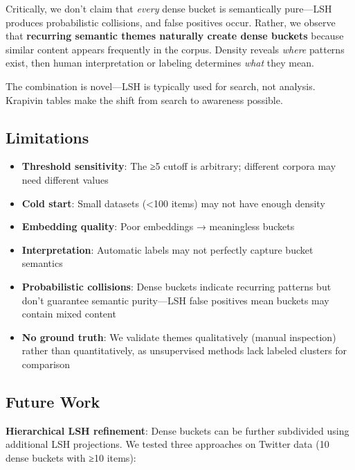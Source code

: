 \documentclass[
]{article}
\providecommand{\tightlist}{%
  \setlength{\itemsep}{0pt}\setlength{\parskip}{0pt}}
\begin{document}
Critically, we don't claim that \emph{every} dense bucket is
semantically pure---LSH produces probabilistic collisions, and false
positives occur. Rather, we observe that \textbf{recurring semantic
themes naturally create dense buckets} because similar content appears
frequently in the corpus. Density reveals \emph{where} patterns exist,
then human interpretation or labeling determines \emph{what} they mean.

The combination is novel---LSH is typically used for search, not
analysis. Krapivin tables make the shift from search to awareness
possible.

\subsection{Limitations}\label{limitations}

\begin{itemize}
\tightlist
\item
  \textbf{Threshold sensitivity}: The ≥5 cutoff is arbitrary; different
  corpora may need different values
\item
  \textbf{Cold start}: Small datasets (\textless100 items) may not have
  enough density
\item
  \textbf{Embedding quality}: Poor embeddings → meaningless buckets
\item
  \textbf{Interpretation}: Automatic labels may not perfectly capture
  bucket semantics
\item
  \textbf{Probabilistic collisions}: Dense buckets indicate recurring
  patterns but don't guarantee semantic purity---LSH false positives
  mean buckets may contain mixed content
\item
  \textbf{No ground truth}: We validate themes qualitatively (manual
  inspection) rather than quantitatively, as unsupervised methods lack
  labeled clusters for comparison
\end{itemize}

\subsection{Future Work}\label{future-work}

\textbf{Hierarchical LSH refinement}: Dense buckets can be further
subdivided using additional LSH projections. We tested three approaches
on Twitter data (10 dense buckets with ≥10 items):
\end{document}
